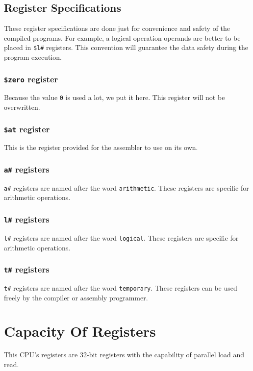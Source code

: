 \documentclass[12pt, dvipsnames, svgnames, x11names, oneside]{book}
\begin{document}
\subsection{Register Specifications}
These register specifications are done just for convenience and safety of the compiled programs. For example, a logical operation operands are better to be placed in \texttt{\$l\#} registers. This convention will guarantee the data safety during the program execution.

\subsubsection{\texttt{\$zero} register}
Because the value \texttt{0} is used a lot, we put it here. This register will not be overwritten.
\subsubsection{\texttt{\$at} register}
This is the register provided for the assembler to use on its own.
\subsubsection{\texttt{a\#} registers}
\texttt{a\#} registers are named after the word \texttt{arithmetic}. These registers are specific for arithmetic operations.
\subsubsection{\texttt{l\#} registers}
\texttt{l\#} registers are named after the word \texttt{logical}. These registers are specific for arithmetic operations.

\subsubsection{\texttt{t\#} registers}			
\texttt{t\#} registers are named after the word \texttt{temporary}. These registers can be used freely by the compiler or assembly programmer.

\section{Capacity Of Registers}\label{sec:cap-of-regs}
This CPU's registers are 32-bit registers with the capability of parallel load and read.
\end{document}
